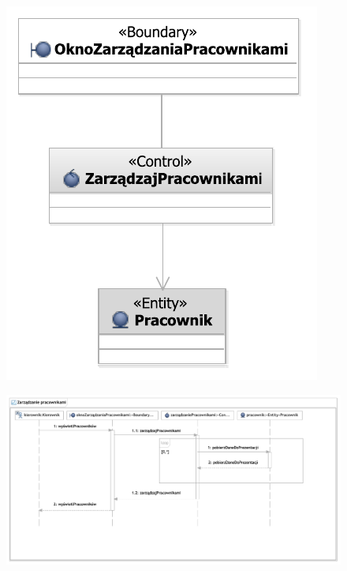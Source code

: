 \begin{figure}[H]
  \centering
  \includegraphics[angle=\ecbangle, scale=\ecbscale]{../img/usecase/pu1ecb.pdf}
  \caption{}
\end{figure}
\newpage
\begin{figure}[H]
  \centering
  \includegraphics[angle=\seqangle, scale=\seqscale]{../img/usecase/pu1seq.pdf}
  \caption{}
\end{figure}
\newpage

